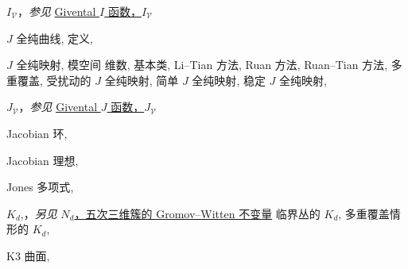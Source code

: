 \begin{theindex}
\indexspace
\item \leavevmode\hypertarget{idx:0641}{$I_{\mathcal V}$}，\textit{参见} \hyperlink{idx:0383}{Givental $I$ 函数，$I_{\mathcal V}$}
\indexspace
\item \leavevmode\hypertarget{idx:0644}{$J$ 全纯曲线},\enspace{}
\subitem \leavevmode\hypertarget{idx:0645}{定义},\enspace{}
\indexspace
\item \leavevmode\hypertarget{idx:0646}{$J$ 全纯映射},\enspace{}
\subitem \leavevmode\hypertarget{idx:0647}{模空间}
\subsubitem \leavevmode\hypertarget{idx:0648}{维数},\enspace{}
\subsubitem \leavevmode\hypertarget{idx:0649}{基本类},\enspace{}
\subsubitem \leavevmode\hypertarget{idx:0650}{Li--Tian 方法},\enspace{}
\subsubitem \leavevmode\hypertarget{idx:0651}{Ruan 方法},\enspace{}
\subsubitem \leavevmode\hypertarget{idx:0652}{Ruan--Tian 方法},\enspace{}
\subitem \leavevmode\hypertarget{idx:0653}{多重覆盖},\enspace{}
\subitem \leavevmode\hypertarget{idx:0654}{受扰动的 $J$ 全纯映射},\enspace{}
\subitem \leavevmode\hypertarget{idx:0655}{简单 $J$ 全纯映射},\enspace{}
\subitem \leavevmode\hypertarget{idx:0656}{稳定 $J$ 全纯映射},\enspace{}
\indexspace
\item \leavevmode\hypertarget{idx:0658}{$J_{\mathcal V}$}，\textit{参见} \hyperlink{idx:0402}{Givental $J$ 函数，$J_{\mathcal V}$}
\indexspace
\item \leavevmode\hypertarget{idx:0643}{Jacobian 环},\enspace{}
\indexspace
\item \leavevmode\hypertarget{idx:0642}{Jacobian 理想},\enspace{}
\indexspace
\item \leavevmode\hypertarget{idx:0657}{Jones 多项式},\enspace{}
\indexspace
\item \leavevmode\hypertarget{idx:0677}{$K_d$},\enspace{}，\textit{另见} \hyperlink{idx:0927}{$N_d$，五次三维簇的 Gromov--Witten 不变量}
\subitem \leavevmode\hypertarget{idx:0678}{临界丛的 $K_d$},\enspace{}
\subitem \leavevmode\hypertarget{idx:0679}{多重覆盖情形的 $K_d$},\enspace{}
\indexspace
\item \leavevmode\hypertarget{idx:0659}{K3 曲面},\enspace{}

\end{theindex}
